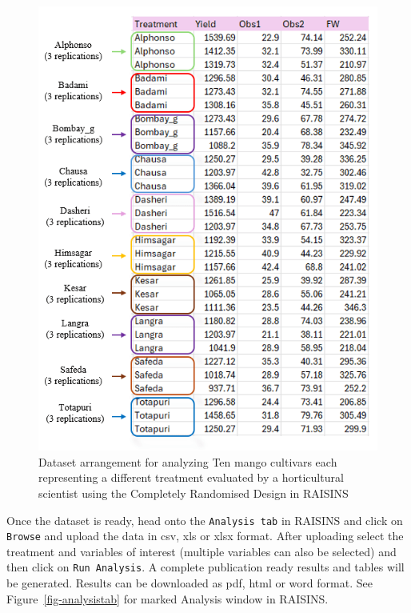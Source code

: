 \documentclass[
  letterpaper,
  DIV=11,
  numbers=noendperiod]{scrartcl}
\begin{document}
\begin{figure}

{\centering \includegraphics{mangodata.webp}

}

\caption{\label{fig-dataset}Dataset arrangement for analyzing Ten mango
cultivars each representing a different treatment evaluated by a
horticultural scientist using the Completely Randomised Design in
RAISINS}

\end{figure}

Once the dataset is ready, head onto the \texttt{Analysis\ tab} in
RAISINS and click on \texttt{Browse} and upload the data in csv, xls or
xlsx format. After uploading select the treatment and variables of
interest (multiple variables can also be selected) and then click on
\texttt{Run\ Analysis}. A complete publication ready results and tables
will be generated. Results can be downloaded as pdf, html or word
format. See Figure~\ref{fig-analysistab} for marked Analysis window in
RAISINS.
\end{document}
